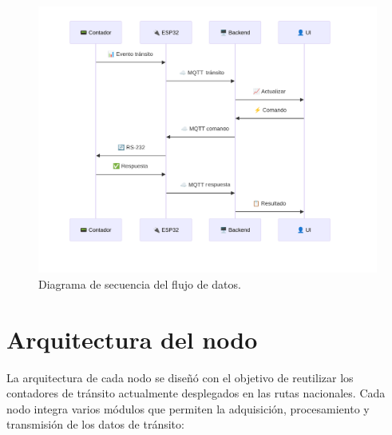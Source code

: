 \begin{figure}[H]
  \centering
  \includegraphics[width=1.15\linewidth]{./Figures/diagSecuencia.png}
  \caption{Diagrama de secuencia del flujo de datos.}
  \label{fig:diag_secuencia}
\end{figure}



\section{Arquitectura del nodo}
La arquitectura de cada nodo se diseñó con el objetivo de reutilizar los contadores de tránsito actualmente desplegados en las rutas nacionales. Cada nodo integra varios módulos que permiten la adquisición, procesamiento y transmisión de los datos de tránsito:

